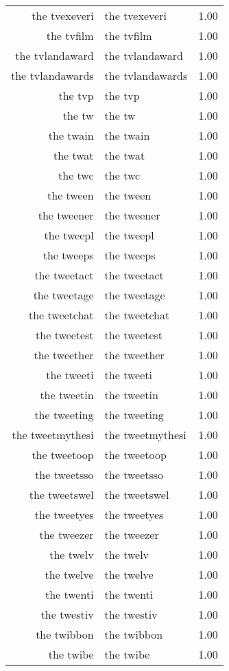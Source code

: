 \begin{table}[ht]
\begin{tabular}{rlr}
  the tvexeveri & the tvexeveri & 1.00 \\ 
  the tvfilm & the tvfilm & 1.00 \\ 
  the tvlandaward & the tvlandaward & 1.00 \\ 
  the tvlandawards & the tvlandawards & 1.00 \\ 
  the tvp & the tvp & 1.00 \\ 
  the tw & the tw & 1.00 \\ 
  the twain & the twain & 1.00 \\ 
  the twat & the twat & 1.00 \\ 
  the twc & the twc & 1.00 \\ 
  the tween & the tween & 1.00 \\ 
  the tweener & the tweener & 1.00 \\ 
  the tweepl & the tweepl & 1.00 \\ 
  the tweeps & the tweeps & 1.00 \\ 
  the tweetact & the tweetact & 1.00 \\ 
  the tweetage & the tweetage & 1.00 \\ 
  the tweetchat & the tweetchat & 1.00 \\ 
  the tweetest & the tweetest & 1.00 \\ 
  the tweether & the tweether & 1.00 \\ 
  the tweeti & the tweeti & 1.00 \\ 
  the tweetin & the tweetin & 1.00 \\ 
  the tweeting & the tweeting & 1.00 \\ 
  the tweetmythesi & the tweetmythesi & 1.00 \\ 
  the tweetoop & the tweetoop & 1.00 \\ 
  the tweetsso & the tweetsso & 1.00 \\ 
  the tweetswel & the tweetswel & 1.00 \\ 
  the tweetyes & the tweetyes & 1.00 \\ 
  the tweezer & the tweezer & 1.00 \\ 
  the twelv & the twelv & 1.00 \\ 
  the twelve & the twelve & 1.00 \\ 
  the twenti & the twenti & 1.00 \\ 
  the twestiv & the twestiv & 1.00 \\ 
  the twibbon & the twibbon & 1.00 \\ 
  the twibe & the twibe & 1.00 \\ 

\end{tabular}
\end{table}
